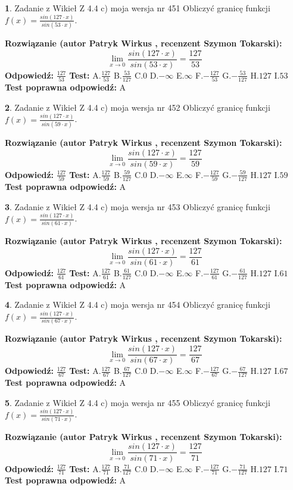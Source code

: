 \documentclass[12pt, a4paper]{article}
\theoremstyle{definition} %
\newtheorem{zad}{}
\newcommand{\zadStart}[1]{\begin{zad}#1\newline}
\newcommand{\zadStop}{\end{zad}}
\newcommand{\rozwStart}[2]{\noindent \textbf{Rozwiązanie (autor #1 , recenzent #2): }\newline}
\newcommand{\rozwStop}{\newline}
\newcommand{\odpStart}{\noindent \textbf{Odpowiedź:}\newline}
\newcommand{\odpStop}{\newline}
\newcommand{\testStart}{\noindent \textbf{Test:}\newline}
\newcommand{\testStop}{\newline}
\newcommand{\kluczStart}{\noindent \textbf{Test poprawna odpowiedź:}\newline}
\newcommand{\kluczStop}{\newline}
\begin{document}
\zadStart{Zadanie z Wikieł Z 4.4 c) moja wersja nr 451}
Obliczyć granicę funkcji $f(x)=\frac{sin(127\cdot x)}{sin(53\cdot x)}$.
\zadStop
\rozwStart{Patryk Wirkus}{Szymon Tokarski}
$$\lim\limits_{x\to 0}\frac{sin(127\cdot x)}{sin(53\cdot x)}=
\frac{127}{53}$$
\rozwStop
\odpStart
$\frac{127}{53}$
\odpStop
\testStart
A.$\frac{127}{53}$
B.$\frac{53}{127}$
C.$0$
D.$-\infty$
E.$\infty$
F.$-\frac{127}{53}$
G.$-\frac{53}{127}$
H.$127$
I.$53$
\testStop
\kluczStart
A
\kluczStop



\zadStart{Zadanie z Wikieł Z 4.4 c) moja wersja nr 452}
Obliczyć granicę funkcji $f(x)=\frac{sin(127\cdot x)}{sin(59\cdot x)}$.
\zadStop
\rozwStart{Patryk Wirkus}{Szymon Tokarski}
$$\lim\limits_{x\to 0}\frac{sin(127\cdot x)}{sin(59\cdot x)}=
\frac{127}{59}$$
\rozwStop
\odpStart
$\frac{127}{59}$
\odpStop
\testStart
A.$\frac{127}{59}$
B.$\frac{59}{127}$
C.$0$
D.$-\infty$
E.$\infty$
F.$-\frac{127}{59}$
G.$-\frac{59}{127}$
H.$127$
I.$59$
\testStop
\kluczStart
A
\kluczStop



\zadStart{Zadanie z Wikieł Z 4.4 c) moja wersja nr 453}
Obliczyć granicę funkcji $f(x)=\frac{sin(127\cdot x)}{sin(61\cdot x)}$.
\zadStop
\rozwStart{Patryk Wirkus}{Szymon Tokarski}
$$\lim\limits_{x\to 0}\frac{sin(127\cdot x)}{sin(61\cdot x)}=
\frac{127}{61}$$
\rozwStop
\odpStart
$\frac{127}{61}$
\odpStop
\testStart
A.$\frac{127}{61}$
B.$\frac{61}{127}$
C.$0$
D.$-\infty$
E.$\infty$
F.$-\frac{127}{61}$
G.$-\frac{61}{127}$
H.$127$
I.$61$
\testStop
\kluczStart
A
\kluczStop



\zadStart{Zadanie z Wikieł Z 4.4 c) moja wersja nr 454}
Obliczyć granicę funkcji $f(x)=\frac{sin(127\cdot x)}{sin(67\cdot x)}$.
\zadStop
\rozwStart{Patryk Wirkus}{Szymon Tokarski}
$$\lim\limits_{x\to 0}\frac{sin(127\cdot x)}{sin(67\cdot x)}=
\frac{127}{67}$$
\rozwStop
\odpStart
$\frac{127}{67}$
\odpStop
\testStart
A.$\frac{127}{67}$
B.$\frac{67}{127}$
C.$0$
D.$-\infty$
E.$\infty$
F.$-\frac{127}{67}$
G.$-\frac{67}{127}$
H.$127$
I.$67$
\testStop
\kluczStart
A
\kluczStop



\zadStart{Zadanie z Wikieł Z 4.4 c) moja wersja nr 455}
Obliczyć granicę funkcji $f(x)=\frac{sin(127\cdot x)}{sin(71\cdot x)}$.
\zadStop
\rozwStart{Patryk Wirkus}{Szymon Tokarski}
$$\lim\limits_{x\to 0}\frac{sin(127\cdot x)}{sin(71\cdot x)}=
\frac{127}{71}$$
\rozwStop
\odpStart
$\frac{127}{71}$
\odpStop
\testStart
A.$\frac{127}{71}$
B.$\frac{71}{127}$
C.$0$
D.$-\infty$
E.$\infty$
F.$-\frac{127}{71}$
G.$-\frac{71}{127}$
H.$127$
I.$71$
\testStop
\kluczStart
A
\kluczStop
\end{document}
